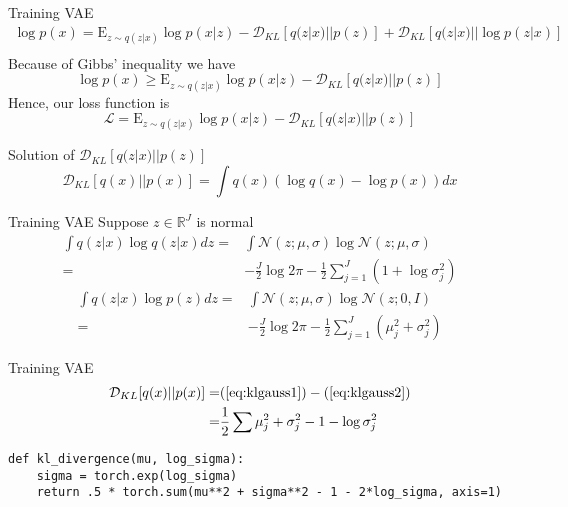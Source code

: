 \documentclass{beamer}
\newcommand{\real}{\mathbb{R}}
\newcommand{\kldiv}{\mathcal{D}_{KL}}
\newcommand{\E}{\mathrm{E}}
\begin{document}
\begin{frame}{Training VAE}
\small
\begin{equation}
\begin{split}
	\log p(x) = \E_{z\sim q(z|x)}\log p(x|z)- \kldiv[q(z|x)||p(z)] + \kldiv[q(z|x)||\log p(z|x)]\\
\end{split}
\end{equation}
\normalsize
Because of Gibbs' inequality we have
\[
	\log p(x)  \geq \E_{z\sim q(z|x)}\log p(x|z)- \kldiv[q(z|x)||p(z)]
\]
Hence, our loss function is
\[
	\mathcal{L} = \E_{z\sim q(z|x)}\log p(x|z)- \kldiv[q(z|x)||p(z)]
\]
\end{frame}

\begin{frame}{Solution of $\kldiv[q(z|x)||p(z)]$}
\[
	\kldiv[q(x)||p(x)] = \int q(x)(\log q(x)-\log p(x))dx
\]
\end{frame}

\begin{frame}{Training VAE}
Suppose $z\in \real^J$ is normal 
\begin{equation}
\begin{split}
\int q(z|x)\log q(z|x)dz =& \int \mathcal{N}(z;\mu, \sigma)\log \mathcal{N}(z;\mu, \sigma)\\
=& -\frac{J}{2} \log 2\pi - \frac{1}{2}\sum_{j=1}^J (1+\log \sigma_j^2)
\end{split}
\label{eq:klgauss1}
\end{equation}
\begin{equation}
\begin{split}
\int q(z|x)\log p(z)dz =& \int \mathcal{N}(z;\mu, \sigma)\log \mathcal{N}(z;0, I)\\
=& -\frac{J}{2} \log 2\pi - \frac{1}{2}\sum_{j=1}^J (\mu_j^2+\sigma_j^2)
\end{split}
\label{eq:klgauss2}
\end{equation}
\end{frame}

\begin{frame}[fragile]{Training VAE}
\begin{equation}
\begin{split}
\kldiv[q(x)||p(x)] =& (\ref{eq:klgauss1})-(\ref{eq:klgauss2})\\
=& \frac{1}{2}\sum \mu_j^2 + \sigma_j^2 - 1 - \log \sigma_j^2
\end{split}
\end{equation}
\begin{verbatim}
def kl_divergence(mu, log_sigma):
    sigma = torch.exp(log_sigma)
    return .5 * torch.sum(mu**2 + sigma**2 - 1 - 2*log_sigma, axis=1)
\end{verbatim}
\end{frame}
\end{document}
